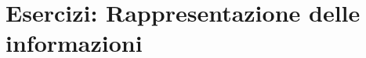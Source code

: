 \chapter{Esercizi: Rappresentazione delle informazioni}
\label{chap:esercizi-rappresentazione-informazioni}